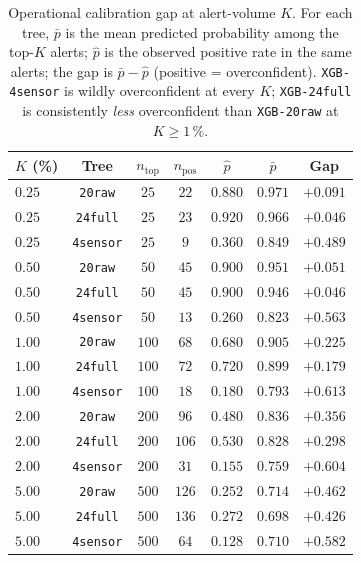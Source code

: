 \documentclass{article}
\begin{document}
\begin{table}[t]
\centering
\small
\caption{Operational calibration gap at alert-volume $K$. For each tree,
$\bar{p}$ is the mean predicted probability among the top-$K$ alerts;
$\hat{p}$ is the observed positive rate in the same alerts; the gap is
$\bar{p} - \hat{p}$ (positive = overconfident). \texttt{XGB-4sensor} is
wildly overconfident at every $K$; \texttt{XGB-24full} is consistently
\emph{less} overconfident than \texttt{XGB-20raw} at $K \ge 1\,\%$.}
\label{tab:p8-op-cal}
\begin{tabular}{lcccccc}
\toprule
$K$ (\%) & Tree & $n_{\text{top}}$ & $n_{\text{pos}}$ & $\hat{p}$ & $\bar{p}$ & Gap \\
\midrule
$0.25$ & \texttt{20raw}  & $25$  & $22$ & $0.880$ & $0.971$ & $+0.091$ \\
$0.25$ & \texttt{24full} & $25$  & $23$ & $0.920$ & $0.966$ & $+0.046$ \\
$0.25$ & \texttt{4sensor}& $25$  & $9$  & $0.360$ & $0.849$ & $+0.489$ \\
$0.50$ & \texttt{20raw}  & $50$  & $45$ & $0.900$ & $0.951$ & $+0.051$ \\
$0.50$ & \texttt{24full} & $50$  & $45$ & $0.900$ & $0.946$ & $+0.046$ \\
$0.50$ & \texttt{4sensor}& $50$  & $13$ & $0.260$ & $0.823$ & $+0.563$ \\
$1.00$ & \texttt{20raw}  & $100$ & $68$ & $0.680$ & $0.905$ & $+0.225$ \\
$1.00$ & \texttt{24full} & $100$ & $72$ & $0.720$ & $0.899$ & $+0.179$ \\
$1.00$ & \texttt{4sensor}& $100$ & $18$ & $0.180$ & $0.793$ & $+0.613$ \\
$2.00$ & \texttt{20raw}  & $200$ & $96$ & $0.480$ & $0.836$ & $+0.356$ \\
$2.00$ & \texttt{24full} & $200$ & $106$& $0.530$ & $0.828$ & $+0.298$ \\
$2.00$ & \texttt{4sensor}& $200$ & $31$ & $0.155$ & $0.759$ & $+0.604$ \\
$5.00$ & \texttt{20raw}  & $500$ & $126$& $0.252$ & $0.714$ & $+0.462$ \\
$5.00$ & \texttt{24full} & $500$ & $136$& $0.272$ & $0.698$ & $+0.426$ \\
$5.00$ & \texttt{4sensor}& $500$ & $64$ & $0.128$ & $0.710$ & $+0.582$ \\
\bottomrule
\end{tabular}
\end{table}
\end{document}
